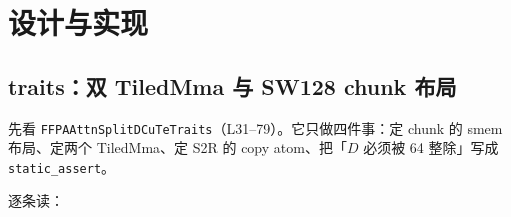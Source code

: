 \section{设计与实现}

\subsection{traits：双 TiledMma 与 SW128 chunk 布局}

先看 \texttt{FFPAAttn}\allowbreak\texttt{SplitDCuTe}\allowbreak\texttt{Traits}（L31--79）。它只做四件事：定 chunk 的 smem
布局、定两个 TiledMma、定 S2R 的 copy atom、把「$D$ 必须被 64 整除」写成
\texttt{static\_\allowbreak{}assert}。



逐条读：

